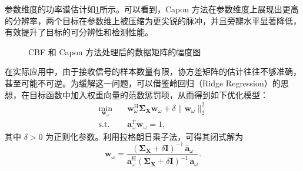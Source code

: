\begin{solution}
    参数维度的功率谱估计如\cref{fig_compressed_capon2}所示。可以看到，Capon 方法在参数维度上展现出更高的分辨率，两个目标在参数维上被压缩为更尖锐的脉冲，并且旁瓣水平显著降低，有效提升了目标的可分辨性和检测性能。
    \begin{figure}[htb!]
        \centering
        \caption{CBF 和 Capon 方法处理后的数据矩阵的幅度图}
        \label{fig_compressed_capon2}
    \end{figure}
\end{solution}


在实际应用中，由于接收信号的样本数量有限，协方差矩阵的估计往往不够准确，甚至可能不可逆。为缓解这一问题，可以借鉴岭回归（Ridge Regression）的思想，在目标函数中加入权重向量的范数惩罚项，从而得到如下优化模型：
\[
    \begin{aligned}
        \min_{\bm{w}_{\omega}} \quad &
        \bm{w}_{\omega}^{\mathrm{H}} \mathbf{\Sigma}_{\mathbf{X}} \bm{w}_{\omega}
        + \delta \|\bm{w}_{\omega}\|_2^2                                                 \\
        \text{s.t.} \quad            & \bm{a}_{\omega}^{\mathrm{T}} \bm{w}_{\omega} = 1,
    \end{aligned}
\]
其中 \(\delta > 0\) 为正则化参数。利用拉格朗日乘子法，可得其闭式解为
\[
    \bm{w}_{\omega}
    = \frac{(\mathbf{\Sigma}_{\mathbf{X}} + \delta \mathbf{I})^{-1} \,\overline{\bm{a}}_{\omega}}
    {\overline{\bm{a}}_{\omega}^{\mathrm{H}} (\mathbf{\Sigma}_{\mathbf{X}} + \delta \mathbf{I})^{-1} \,\overline{\bm{a}}_{\omega}}.
\]

